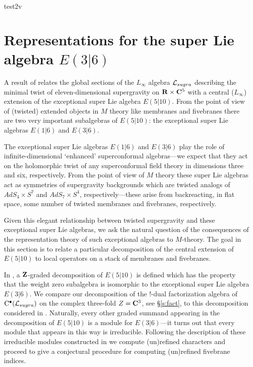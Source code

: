 \documentclass[11pt]{amsart}
\begin{document}
test2v

\section{Representations for the super Lie algebra $E(3|6)$}
\label{s:kr}

A result of \cite{RSW} relates the global sections of the $L_\infty$ algebra $\mathcal L_{sugra}$ describing the minimal twist of eleven-dimensional supergravity on $\mathbf{R} \times \mathbf{C}^5$ with a central ($L_\infty$) extension of the exceptional super Lie algebra $E(5|10)$.
From the point of view of (twisted) extended objects in $M$ theory like membranes and fivebranes there are two very important subalgebras of $E(5|10)$: the exceptional super Lie algebras $E(1|6)$ and $E(3|6)$. 

The exceptional super Lie algebras $E(1|6)$ and $E(3|6)$ play the role of infinite-dimensional `enhanced' superconformal algebras---we expect that they act on the holomorphic twist of any superconformal field theory in dimensions three and six, respectively.
From the point of view of $M$ theory these super Lie algebras act as symmetries of supergravity backgrounds which are twisted analogs of $AdS_4 \times S^7$ and $AdS_7 \times S^4$, respectively---these arise from backreacting, in flat space, some number of twisted membranes and fivebranes, respectively. 

Given this elegant relationship between twisted supergravity and these exceptional super Lie algebras, we ask the natural question of the consequences of the representation theory of such exceptional algebras to $M$-theory. 
The goal in this section is to relate a particular decomposition of the central extension of $E(5|10)$ to local operators on a stack of membranes and fivebranes.

In \cite{KR2}, a $\mathbf{Z}$-graded decomposition of $E(5|10)$ is defined which has the property that the weight zero subalgebra is isomorphic to the exceptional super Lie algebra $E(3|6)$.
We compare our decomposition of the $!$-dual factorization algebra of ${\rm C}^\bullet(\mathcal L_{sugra})$ on the complex three-fold $Z = \mathbf{C}^3$, see \S \ref{s:fact}, to this decomposition considered in \cite{KR2}.
Naturally, every other graded summand appearing in the decomposition of $E(5|10)$ is a module for $E(3|6)$---it turns out that every module that appears in this way is irreducible.
Following the description of these irreducible modules constructed in \cite{KR1,KR2} we compute (un)refined characters and proceed to give a conjectural procedure for computing (un)refined fivebrane indices.
\end{document}
